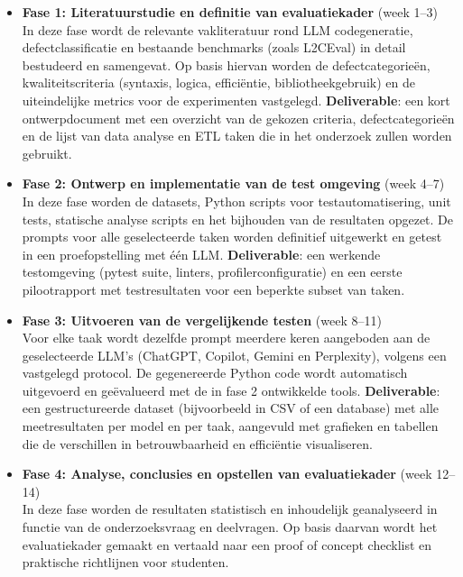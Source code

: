 \documentclass{hogent-article}
\begin{document}
\begin{itemize}
    \item \textbf{Fase 1: Literatuurstudie en definitie van evaluatiekader} (week 1--3)\\
    In deze fase wordt de relevante vakliteratuur rond LLM codegeneratie, defectclassificatie en bestaande benchmarks (zoals L2CEval) in detail bestudeerd en samengevat. Op basis hiervan worden de defectcategorieën, kwaliteitscriteria (syntaxis, logica, efficiëntie, bibliotheekgebruik) en de uiteindelijke metrics voor de experimenten vastgelegd. \textbf{Deliverable}: een kort ontwerpdocument met een overzicht van de gekozen criteria, defectcategorieën en de lijst van data analyse en ETL taken die in het onderzoek zullen worden gebruikt.
    
    \item \textbf{Fase 2: Ontwerp en implementatie van de test omgeving} (week 4--7)\\
    In deze fase worden de datasets, Python scripts voor testautomatisering, unit tests, statische analyse scripts en het bijhouden van de resultaten opgezet. De prompts voor alle geselecteerde taken worden definitief uitgewerkt en getest in een proefopstelling met één LLM. \textbf{Deliverable}: een werkende testomgeving (pytest suite, linters, profilerconfiguratie) en een eerste pilootrapport met testresultaten voor een beperkte subset van taken.
    
    \item \textbf{Fase 3: Uitvoeren van de vergelijkende testen} (week 8--11)\\
    Voor elke taak wordt dezelfde prompt meerdere keren aangeboden aan de geselecteerde LLM’s (ChatGPT, Copilot, Gemini en Perplexity), volgens een vastgelegd protocol. De gegenereerde Python code wordt automatisch uitgevoerd en geëvalueerd met de in fase 2 ontwikkelde tools. \textbf{Deliverable}: een gestructureerde dataset (bijvoorbeeld in CSV of een database) met alle meetresultaten per model en per taak, aangevuld met grafieken en tabellen die de verschillen in betrouwbaarheid en efficiëntie visualiseren.
    
    \item \textbf{Fase 4: Analyse, conclusies en opstellen van evaluatiekader} (week 12--14)\\
    In deze fase worden de resultaten statistisch en inhoudelijk geanalyseerd in functie van de onderzoeksvraag en deelvragen. Op basis daarvan wordt het evaluatiekader gemaakt en vertaald naar een proof of concept checklist en praktische richtlijnen voor studenten.
\end{itemize}
\end{document}
